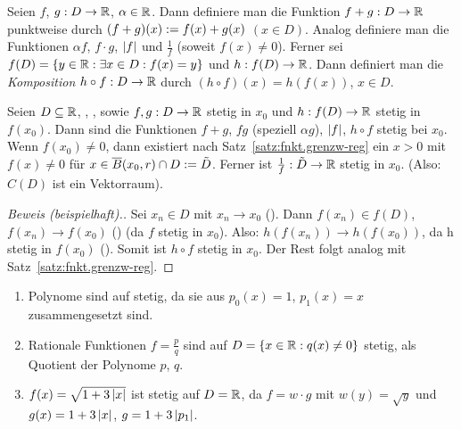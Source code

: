 \documentclass[12pt]{scrreprt}
\begin{document}
\begin{dfn*}
Seien $f$, $g: D\rightarrow\mathbb{R}$, $\alpha\in\mathbb{R}$. Dann definiere man die Funktion $f+g: D\rightarrow\mathbb{R}$ punktweise durch
$(f+g)(x) := f(x) + g(x)$ $(x\in D)$. Analog definiere man die Funktionen $\alpha f$, $f\cdot g$, $\left\lvert f\right\lvert$ und $\frac{1}{f}$
(soweit $f(x) \ne 0$). Ferner sei $f(D) = \{y\in\mathbb{R}:\exists x\in D: f(x)=y\}$ und $h: f(D)\rightarrow\mathbb{R}$. Dann
definiert man die \emph{Komposition} $h\circ f:D\rightarrow\mathbb{R}$ durch $(h\circ f)(x) = h(f(x))$, $x\in D$.
\end{dfn*}

\begin{satz}\label{satz:fnkt.uebertragung-stetigk}
Seien $D\subseteq\mathbb{R}$, , \reell{\alpha}, sowie $f, g: D\rightarrow\mathbb{R}$ stetig in $x_0$ und $h: f(D)\rightarrow\mathbb{R}$ 
stetig in $f(x_0)$. Dann sind die Funktionen $f+g$, $fg$ (speziell $\alpha g$), $\left\lvert f\right\lvert$, $h\circ f$ stetig bei $x_0$.
Wenn $f(x_0)\ne0$, dann existiert nach Satz~\ref{satz:fnkt.grenzw-reg} ein $x > 0$ mit $f(x)\ne 0$ für $x\in\overline{B}(x_0, r)\cap D := \tilde{D}$.
Ferner ist $\frac{1}{f}: \tilde{D}\rightarrow\mathbb{R}$ stetig in $x_0$. (Also: $C(D)$ ist ein Vektorraum).
\end{satz}
\begin{proof}[Beweis (beispielhaft).]
Sei $x_n\in D$ mit $x_n\to x_0$ (\ninf). Dann $f(x_n)\in f(D)$, $f(x_n)\to f(x_0)$ (\ninf) (da $f$ stetig in $x_0$).
Also: $h(f(x_n))\to h(f(x_0))$, da h stetig in $f(x_0)$ (\ninf). Somit ist $h\circ f$ stetig in $x_0$. Der Rest folgt
analog mit Satz~\ref{satz:fnkt.grenzw-reg}.
\end{proof}

\begin{bsp}\label{bsp:fnkt.uebertragung-stetigk}
\begin{enumerate}
\item Polynome sind auf  stetig, da sie aus $p_0(x)=1$, $p_1(x)=x$ zusammengesetzt sind.\label{bsp:fnkt.uebertragung-stetigk.a}
\item Rationale Funktionen $f=\frac{p}{q}$ sind auf $D=\{x\in\mathbb{R}: q(x)\ne 0\}$ stetig, als Quotient
der Polynome $p$, $q$.\label{bsp:fnkt.uebertragung-stetigk.b}
\item $f(x) = \sqrt{1+3\left\lvert x\right\lvert}$ ist stetig auf $D=\mathbb{R}$, da $f=w\cdot g$ mit $w(y)=\sqrt{y}$ und $g(x)=1+3\left\lvert x\right\lvert$, $g=1+3\left\lvert p_1\right\lvert$.\label{bsp:fnkt.uebertragung-stetigk.c}
\end{enumerate}
\end{bsp}
\end{document}
